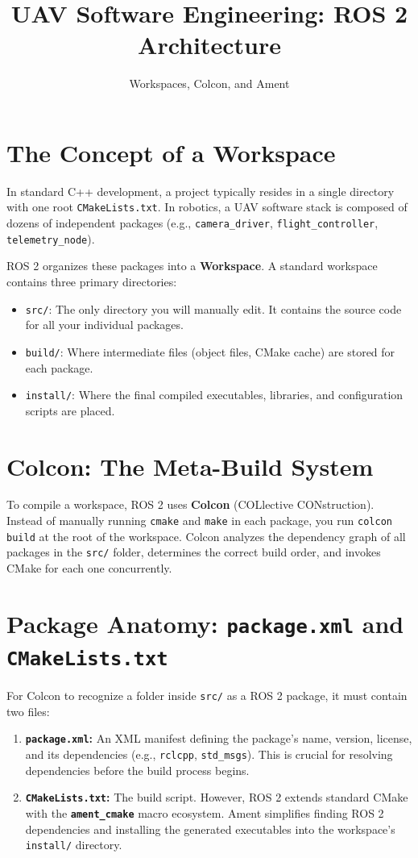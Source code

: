 \documentclass{article}
\title{UAV Software Engineering: ROS 2 Architecture}
\author{Workspaces, Colcon, and Ament}
\date{}
\begin{document}
\maketitle

\section{The Concept of a Workspace}
In standard C++ development, a project typically resides in a single directory with one root \texttt{CMakeLists.txt}. 
In robotics, a UAV software stack is composed of dozens of independent packages (e.g., \texttt{camera\_driver}, \texttt{flight\_controller}, 
\texttt{telemetry\_node}). 

ROS 2 organizes these packages into a \textbf{Workspace}. A standard workspace contains three primary directories:
\begin{itemize}
    \item \texttt{src/}: The only directory you will manually edit. It contains the source code for all your individual packages.
    \item \texttt{build/}: Where intermediate files (object files, CMake cache) are stored for each package.
    \item \texttt{install/}: Where the final compiled executables, libraries, and configuration scripts are placed.
\end{itemize}

\section{Colcon: The Meta-Build System}
To compile a workspace, ROS 2 uses \textbf{Colcon} (COLlective CONstruction). Instead of manually running \texttt{cmake} and \texttt{make} in each package, 
you run \texttt{colcon build} at the root of the workspace. Colcon analyzes the dependency graph of all packages in the \texttt{src/} folder, 
determines the correct build order, and invokes CMake for each one concurrently.

\section{Package Anatomy: \texttt{package.xml} and \texttt{CMakeLists.txt}}
For Colcon to recognize a folder inside \texttt{src/} as a ROS 2 package, it must contain two files:
\begin{enumerate}
    \item \textbf{\texttt{package.xml}:} An XML manifest defining the package's name, version, license, and its dependencies (e.g., \texttt{rclcpp}, 
    \texttt{std\_msgs}). This is crucial for resolving dependencies before the build process begins.
    \item \textbf{\texttt{CMakeLists.txt}:} The build script. However, ROS 2 extends standard CMake with the \textbf{\texttt{ament\_cmake}} macro ecosystem. 
    Ament simplifies finding ROS 2 dependencies and installing the generated executables into the workspace's \texttt{install/} directory.
\end{enumerate}
\end{document}
